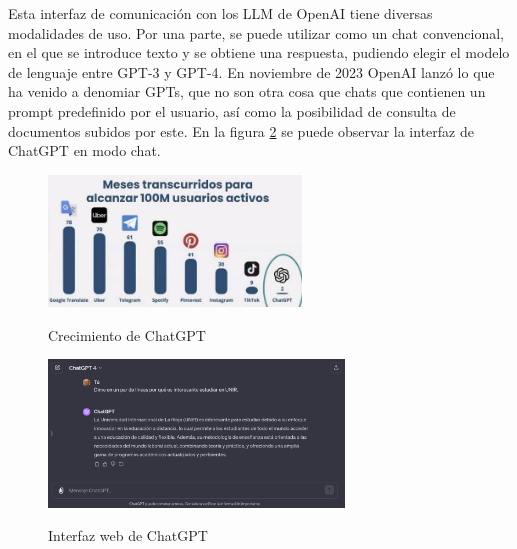         Esta interfaz de comunicación con los LLM de OpenAI tiene diversas modalidades de uso. Por una parte, se puede utilizar como un chat convencional, en el que se introduce texto y se obtiene una respuesta, pudiendo elegir el modelo de lenguaje entre GPT-3 y GPT-4. En noviembre de 2023 OpenAI lanzó lo que ha venido a denomiar GPTs, que no son otra cosa que chats que contienen un prompt predefinido por el usuario, así como la posibilidad de consulta de documentos subidos por este. En la figura \ref{fig:chatgpt} se puede observar la interfaz de ChatGPT en modo chat.

        \begin{figure}[h]
            \caption[Crecimiento de ChatGPT]{Crecimiento de ChatGPT}
            \centering
            \includegraphics[width=0.6\textwidth]{./figuras/100millonesUsuariosChatgpt.jpeg}
            \label{fig:crecimiento_chatgpt}
        \end{figure}

        \begin{figure}[h]
            \caption[Interfaz web de ChatGPT]{Interfaz web de ChatGPT}
            \centering
            \includegraphics[width=0.7\textwidth]{./figuras/interfaz_chatgpt.png}
            \source{\propio}
            \label{fig:chatgpt}
        \end{figure}


